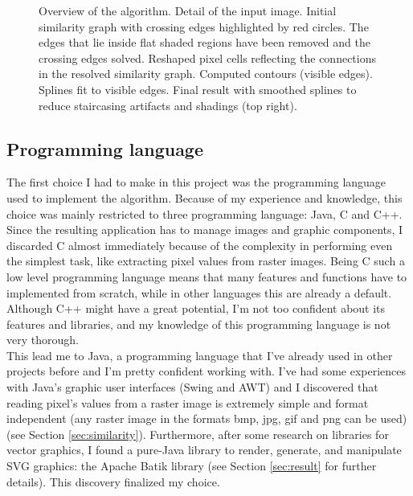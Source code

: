 \documentclass[]{usiinfbachelorproject}
\begin{document}
\begin{figure}[ht]
{		\label{fig:av6}
	}
	\caption{Overview of the algorithm.  Detail of the input image.  Initial similarity graph with crossing edges highlighted by red circles. The edges that lie inside flat shaded regions have been removed and the crossing edges solved.  Reshaped pixel cells reflecting the connections in the resolved similarity graph.  Computed contours (visible edges).  Splines fit to visible edges.  Final result with smoothed splines to reduce staircasing artifacts and shadings (top right).}
	\label{fig:algo}
\end{figure}


\subsection{Programming language}

The first choice I had to make in this project was the programming language used to implement the algorithm. Because of my experience and knowledge, this choice was mainly restricted to three programming language: Java, C and C++. \\
Since the resulting application has to manage images and graphic components, I discarded C almost immediately because of the complexity in performing even the simplest task, like extracting pixel values from raster images. Being C such a low level programming language means that many features and functions have to implemented from scratch, while in other languages this are already a default. \\
Although C++ might have a great potential, I'm not too confident about its features and libraries, and my knowledge of this programming language is not very thorough.\\
This lead me to Java, a programming language that I've already used in other projects before and I'm pretty confident working with. I've had some experiences with Java's graphic user interfaces (Swing and AWT) and I discovered that reading pixel's values from a raster image is extremely simple and format independent (any raster image in the formats bmp, jpg, gif and png can be used) (see Section \ref{sec:similarity}). Furthermore, after some research on libraries for vector graphics, I found a pure-Java library to render, generate, and manipulate SVG graphics: the Apache Batik library \cite{Batik} (see Section \ref{sec:result} for further details). This discovery finalized my choice.
\end{document}
